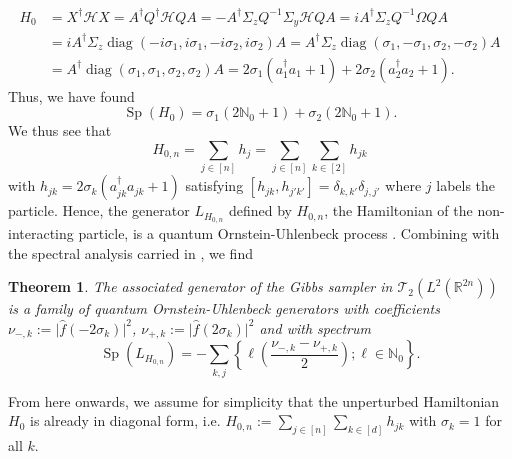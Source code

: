 \documentclass[11pt]{amsart}
\newcommand{\1}{\mathbbm{1}}
\theoremstyle{plain}
\newtheorem{theorem}{Theorem}[section]
\theoremstyle{definition}
\theoremstyle{remark}
\numberwithin{equation}{section}
\begin{document}
\[ \begin{split} H_0 
&= X^{\dagger} \mathcal H X = A^{\dagger} Q^{\dagger} \mathcal H QA =-A^{\dagger}\Sigma_z Q^{-1}\Sigma_y \mathcal H QA = i A^{\dagger} \Sigma_z Q^{-1} \Omega Q A \\
& =i A^{\dagger} \Sigma_z \operatorname{diag}(-i\sigma_1,i\sigma_1,-i\sigma_2,i\sigma_2) A = A^{\dagger} \Sigma_z \operatorname{diag}(\sigma_1,-\sigma_1,\sigma_2,-\sigma_2)A \\
& = A^{\dagger} \operatorname{diag}(\sigma_1,\sigma_1,\sigma_2,\sigma_2)A = 2\sigma_1 (a_1^{\dagger}a_1+1) + 2\sigma_2 (a_2^{\dagger}a_2+1).\end{split} \]
Thus, we have found
\[ \operatorname{Sp}(H_0) = \sigma_1(2\mathbb N_0+1)+\sigma_2(2\mathbb N_0+1).\]
We thus see that 
\[H_{0,n} =\sum_{j\in[n]} h_j= \sum_{j\in[n]} \sum_{k\in[2]} h_{jk}\] with $h_{jk}=2 \sigma_k (a_{jk}^{\dagger}a_{jk}+1)$ satisfying 
$[h_{jk},h_{j'k'}]=\delta_{k,k'}\delta_{j,j'}$ where $j$ labels the particle. Hence, the generator $L_{H_{0,n}}$ defined by $H_{0,n}$, the Hamiltonian of the non-interacting particle, is a quantum Ornstein-Uhlenbeck process \cite{OU}. Combining with the spectral analysis carried in \cite{OU}, we find
\begin{theorem}
\label{thm:DFT2}
   The associated generator of the Gibbs sampler in $\mathscr{T}_2(L^2(\mathbb{R}^{2n}))$ is a family of quantum Ornstein-Uhlenbeck generators with coefficients $\nu_{-,k}:=\vert  \widehat{f}(-2\sigma_k)\vert^2 $, $\nu_{+,k}:=\vert  \widehat{f}(2\sigma_k)\vert^2$ and
with spectrum 
\[ \operatorname{Sp}(L_{H_{0,n}}) =- \sum_{k,j}\left\{ \ell\left(\frac{\nu_{-,k}-\nu_{+,k}}{2}\right) ; \ell \in \mathbb N_0\right\}. \]
\end{theorem}

\noindent From here onwards, we assume for simplicity that the unperturbed Hamiltonian $H_0$ is already in diagonal form, i.e. $H_{0,n}:=\sum_{j\in [n]}\sum_{k\in [d]}h_{jk}$ with $\sigma_k=1$ for all $k$.















\end{document}
